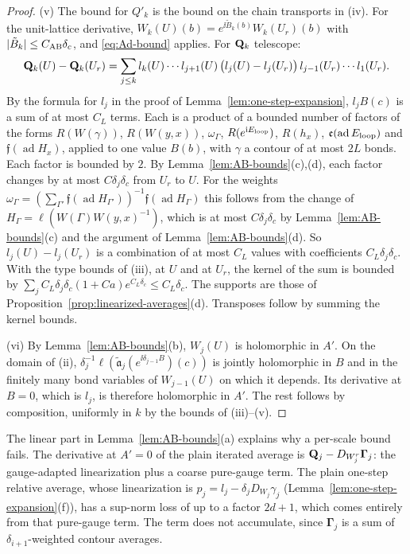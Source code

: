 \begin{proof}
(v) The bound for $Q'_k$ is the bound on the chain transports in (iv). For the unit-lattice derivative, $W_k(U)(b)=e^{\ii\tilde B_k(b)}W_k(U_r)(b)$ with $|\tilde B_k|\le C_{\rm AB}\delta_c$, and \eqref{eq:Ad-bound} applies. For $\mathbf Q_k$ telescope:
\[
\mathbf Q_k(U)-\mathbf Q_k(U_r)=\sum_{j\le k}l_k(U)\cdots l_{j+1}(U)\,\big(l_j(U)-l_j(U_r)\big)\,l_{j-1}(U_r)\cdots l_1(U_r).
\]
By the formula for $l_j$ in the proof of Lemma~\ref{lem:one-step-expansion}, $l_jB(c)$ is a sum of at most $C_L$ terms. Each is a product of a bounded number of factors of the forms $R(W(\gamma))$, $R(W(y,x))$, $\omega_\Gamma$, $R(e^{\mathrm i E_{\rm loop}})$, $R(h_x)$, $\mathfrak e(\operatorname{ad}E_{\rm loop})$ and $\mathfrak f(\operatorname{ad}H_x)$, applied to one value $B(b)$, with $\gamma$ a contour of at most $2L$ bonds. Each factor is bounded by $2$. By Lemma~\ref{lem:AB-bounds}(c),(d), each factor changes by at most $C\delta_j\delta_c$ from $U_r$ to $U$. For the weights $\omega_\Gamma=(\sum_{\Gamma'}\mathfrak f(\operatorname{ad}H_{\Gamma'}))^{-1}\mathfrak f(\operatorname{ad}H_\Gamma)$ this follows from the change of $H_\Gamma=\ell(W(\Gamma)W(y,x)^{-1})$, which is at most $C\delta_j\delta_c$ by Lemma~\ref{lem:AB-bounds}(c) and the argument of Lemma~\ref{lem:AB-bounds}(d). So $l_j(U)-l_j(U_r)$ is a combination of at most $C_L$ values with coefficients $C_L\delta_j\delta_c$. With the type bounds of (iii), at $U$ and at $U_r$, the kernel of the sum is bounded by $\sum_jC_L\delta_j\delta_c(1+Ca)e^{C_L\delta_c}\le C_L\delta_c$. The supports are those of Proposition~\ref{prop:linearized-averages}(d). Transposes follow by summing the kernel bounds.

(vi) By Lemma~\ref{lem:AB-bounds}(b), $W_j(U)$ is holomorphic in $A'$. On the domain of (ii), $\delta_j^{-1}\ell(\tilde{\mathfrak a}_j(e^{\ii\delta_{j-1}B})(c))$ is jointly holomorphic in $B$ and in the finitely many bond variables of $W_{j-1}(U)$ on which it depends. Its derivative at $B=0$, which is $l_j$, is therefore holomorphic in $A'$. The rest follows by composition, uniformly in $k$ by the bounds of (iii)--(v).
\end{proof}

\begin{remark}\label{rem:AB-outline}
The linear part in Lemma~\ref{lem:AB-bounds}(a) explains why a per-scale bound fails. The derivative at $A'=0$ of the plain iterated average is $\mathbf Q_j-D_{W^r_j}\boldsymbol\Gamma_j$: the gauge-adapted linearization plus a coarse pure-gauge term. The plain one-step relative average, whose linearization is $p_j=l_j-\delta_jD_{W_j}\gamma_j$ (Lemma~\ref{lem:one-step-expansion}(f)), has a sup-norm loss of up to a factor $2d+1$, which comes entirely from that pure-gauge term. The term does not accumulate, since $\boldsymbol\Gamma_j$ is a sum of $\delta_{i+1}$-weighted contour averages.
\end{remark}

